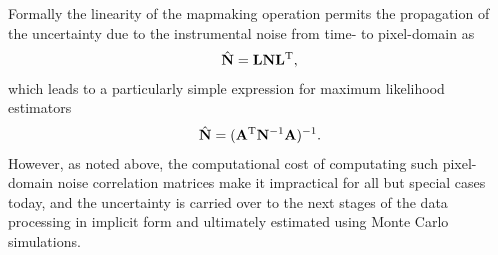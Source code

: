 Formally the linearity of the mapmaking operation permits the propagation of the uncertainty due to the instrumental noise from time- to pixel-domain as
\begin{eqnarray}
{\hat{\mathbf{N}}} = \mathbf{L} \mathbf{N} \mathbf{L}^{\rm T},
\end{eqnarray}
which leads to a particularly simple expression for maximum likelihood estimators 
\begin{eqnarray}
{\hat{\mathbf{N}}} = (\mathbf{A}^{\rm T} \mathbf{N}^{-1} \mathbf{A})^{-1}.
\end{eqnarray}
However, as noted above, the computational cost of computating such pixel-domain noise correlation matrices make it impractical for all but special cases today, and the uncertainty is carried over to the next stages of the data processing in implicit form and ultimately estimated using Monte Carlo simulations.

%



